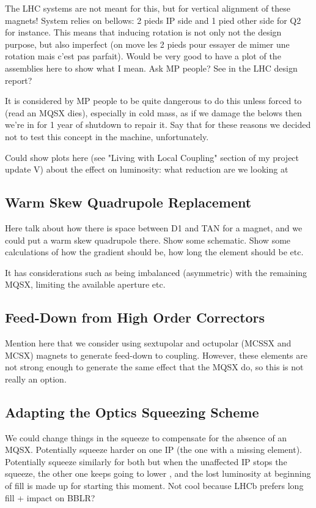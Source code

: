 The LHC systems are not meant for this, but for vertical alignment of these magnets!
System relies on bellows: 2 pieds IP side and 1 pied other side for Q2 for instance.
This means that inducing rotation is not only not the design purpose, but also imperfect (on move les 2 pieds pour essayer de mimer une rotation mais c'est pas parfait).
Would be very good to have a plot of the assemblies here to show what I mean. Ask MP people? See in the LHC design report?

It is considered by MP people to be quite dangerous to do this unless forced to (read an MQSX dies), especially in cold mass, as if we damage the belows then we're in for 1 year of shutdown to repair it.
Say that for these reasons we decided not to test this concept in the machine, unfortunately.

Could show plots here (see "Living with Local Coupling" section of my project update V) about the effect on luminosity: what reduction are we looking at 

\subsection{Warm Skew Quadrupole Replacement}

Here talk about how there is space between D1 and TAN for a magnet, and we could put a warm skew quadrupole there.
Show some schematic.
Show some calculations of how the gradient should be, how long the element should be etc.

It has considerations such as being imbalanced (asymmetric) with the remaining MQSX, limiting the available aperture etc.

\subsection{Feed-Down from High Order Correctors}

Mention here that we consider using sextupolar and octupolar (MCSSX and MCSX) magnets to generate feed-down to coupling.
However, these elements are not strong enough to generate the same effect that the MQSX do, so this is not really an option.

\subsection{Adapting the Optics Squeezing Scheme}

We could change things in the squeeze to compensate for the absence of an MQSX.
Potentially squeeze harder on one IP (the one with a missing element).
Potentially squeeze similarly for both but when the unaffected IP stops the squeeze, the other one keeps going to lower \betastar, and the lost luminosity at beginning of fill is made up for starting this moment.
Not cool because LHCb prefers long fill + impact on BBLR?

